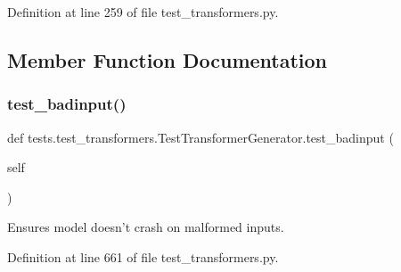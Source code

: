 Definition at line 259 of file test\+\_\+transformers.\+py.



\subsection{Member Function Documentation}
\mbox{\label{classtests_1_1test__transformers_1_1TestTransformerGenerator_a6a21a74b697b8918bc38625e443e24d1}} 
\subsubsection{\texorpdfstring{test\+\_\+badinput()}{test\_badinput()}}
{\footnotesize\ttfamily def tests.\+test\+\_\+transformers.\+Test\+Transformer\+Generator.\+test\+\_\+badinput (\begin{DoxyParamCaption}\item[{}]{self }\end{DoxyParamCaption})}

\begin{DoxyVerb}Ensures model doesn't crash on malformed inputs.
\end{DoxyVerb}
 

Definition at line 661 of file test\+\_\+transformers.\+py.


